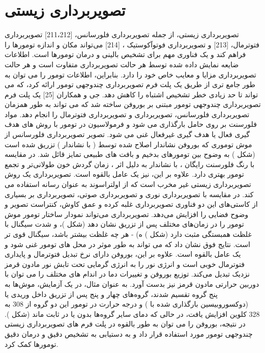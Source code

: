 \section{تصویربرداری زیستی}
تصویربرداری زیستی، از جمله تصویربرداری فلورسانس، \cite{gaoVivoCancerTargeting2004, medintzQuantumDotBioconjugates2005}[211،212] تصویربرداری فتوترمال، \cite{huangCancerCellImaging2006}[213] و تصویربرداری فوتوآکوستیک ، \cite{beardBiomedicalPhotoacousticImaging2011}[214] می‌تواند مکان و اندازه تومورها را فراهم کند و یک فناوری مهم برای تشخیص بالینی و درمان تومورها است. اطلاعات ضایعه نمایش داده شده توسط هر حالت تصویربرداری متفاوت است و هر حالت تصویربرداری مزایا و معایب خاص خود را دارد. بنابراین، اطلاعات تومور را می توان به طور جامع تری از طریق یک پلت فرم تصویربرداری چندوجهی تومور ارائه کرد، که می تواند تا حد زیادی خطر تشخیص اشتباه را کاهش دهد. جی و همکاران \cite{jiNovelTopDownSynthesis2018}[25] یک پلت فرم تصویربرداری چندوجهی تومور مبتنی بر بوروفن ساخته شد که می تواند به طور همزمان تصویربرداری فلورسانس، تصویربرداری  و تصویربرداری فتوترمال را انجام دهد. مواد فلورسنت بر روی حامل بارگذاری می شود و فرمولاسیون در تومور با روش های هدف گیری فعال یا هدف گیری غیرفعال غنی می شود. تصویر تصویربرداری فلورسانس از موش توموری که بوروفن نشاندار  اصلاح شده توسط  (  با نشاندار ) تزریق شده است (شکل ) به وضوح بین تومورهای بدخیم و بافت های طبیعی تمایز قائل شد. در مقایسه با رنگ فلورسنت رایگان ،  با نشاندار  به دلیل اثر ، زمان گردش خون طولانی‌تر و تجمع تومور بهتری دارد. علاوه بر این،  نیز یک عامل بالقوه  است. تصویربرداری  یک روش تصویربرداری زیستی غیر مخرب است که از اولتراسوند به عنوان رسانه استفاده می کند. در مقایسه با تصویربرداری نوری و تصویربرداری صوتی، تصویربرداری  بر بسیاری از کاستی‌های این دو فناوری تصویربرداری غلبه کرده و عمق کاوش، کنتراست تصویر و وضوح فضایی را افزایش می‌دهد. تصویربرداری  می‌تواند نمودار ساختار تومور موش تومور را در زمان‌های مختلف پس از تزریق  نشان دهد (شکل )، و شدت سیگنال  با غلظت  همبستگی مثبت دارد (شکل ) ه) - هر چه غلظت  بیشتر باشد، سیگنال قوی تر است. نتایج فوق نشان داد که  می تواند به طور موثر در محل های تومور غنی شود و یک عامل بالقوه  است. علاوه بر این، بوروفن دارای نرخ تبدیل فتوترمال و پایداری فتوترمال خوبی است و انرژی نور را به انرژی گرمایی تحت تابش نور مادون قرمز نزدیک  تبدیل می‌کند. توزیع بوروفن و تغییرات دما در اندام های مختلف را می توان با دوربین حرارتی مادون قرمز نیز بدست آورد. به عنوان مثال، در یک آزمایش، موش‌ها به پنج گروه تقسیم شدند، گروه‌های چهار و پنج پس از تزریق داخل وریدی  یا  (دوکسوروبیسین بارگذاری شده با ) و درجه حرارت در تومور این دو گروه از 308 به 328 کلوین افزایش یافت، در حالی که دمای سایر گروه‌ها بدون  یا  در  ثابت ماند (شکل ). در نتیجه، بوروفن را می توان به طور بالقوه در پلت فرم های تصویربرداری زیستی چندوجهی تومور مورد استفاده قرار داد و به دستیابی به تشخیص دقیق و درمان دقیق تومورها کمک کرد.

